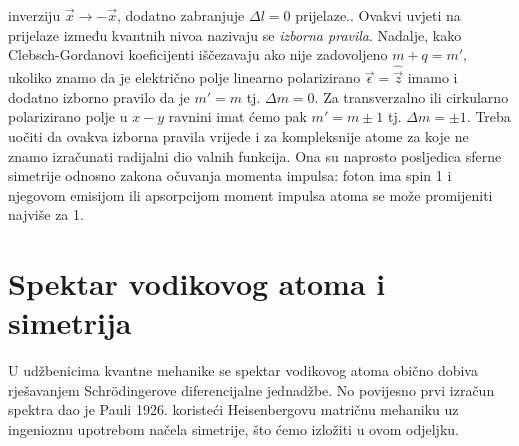 \begin{primjer}
{    inverziju $\vec{x} \to -\vec{x}$, dodatno zabranjuje $\Delta l =0$
prijelaze.}. Ovakvi uvjeti na prijelaze između kvantnih nivoa
nazivaju se \emph{izborna pravila}.
Nadalje, kako Clebsch-Gordanovi koeficijenti iščezavaju ako
nije zadovoljeno $m+q = m'$, ukoliko znamo da je električno
polje linearno polarizirano 
$\vec{\epsilon} = \hat{\vec{z}}$ imamo i dodatno izborno
pravilo da je $m'=m$ tj. $\Delta m = 0$. Za transverzalno
ili cirkularno polarizirano polje u $x-y$ ravnini imat ćemo
pak $m'= m\pm 1$ tj. $\Delta m = \pm 1$.
Treba uočiti da ovakva izborna pravila vrijede i za kompleksnije
atome za koje ne znamo izračunati radijalni dio valnih funkcija.
Ona su naprosto posljedica sferne simetrije odnosno zakona očuvanja
momenta impulsa: foton ima spin 1 i njegovom emisijom ili apsorpcijom
moment impulsa atoma se može promijeniti najviše za 1.
\end{primjer}



\section{Spektar vodikovog atoma i  simetrija}
\label{sec:so4}

U udžbenicima kvantne mehanike se spektar vodikovog atoma obično
dobiva rješavanjem Schr\"{o}dingerove diferencijalne jednadžbe.
No povijesno prvi izračun spektra dao je Pauli 1926.
koristeći Heisenbergovu matričnu mehaniku uz
ingenioznu upotrebom načela simetrije, što ćemo izložiti u ovom odjeljku.


